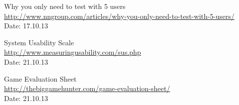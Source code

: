 \begin{thebibliography}{99}
	Why you only need to test with 5 users \\
	\href {http://www.nngroup.com/articles/why-you-only-need-to-test-with-5-users/}{http://www.nngroup.com/articles/why-you-only-need-to-test-with-5-users/} \\
	Date: 17.10.13

	System Usability Scale \\
	\href {http://www.measuringusability.com/sus.php}{http://www.measuringusability.com/sus.php} \\
	Date: 21.10.13 

	Game Evaluation Sheet \\
	\href {http://thebiggamehunter.com/game-evaluation-sheet/}{http://thebiggamehunter.com/game-evaluation-sheet/} \\
	Date: 21.10.13
\end{thebibliography}